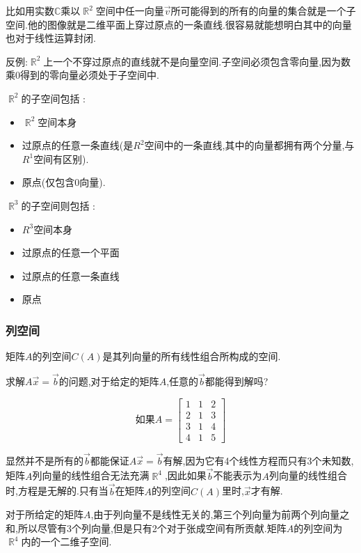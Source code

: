 \documentclass[UTF8,12pt]{ctexbook}
\newcommand{\mathConstant}{\mathbb{C}}
\DeclareMathOperator{\mathRealNumberCollection}{\mathbb{R}}
\begin{document}
{{{{{  比如用实数$\mathConstant$乘以$\mathRealNumberCollection^2$空间中任一向量$\vec{v}$所可能得到的所有的向量的集合就是一个子空间.他的图像就是二维平面上穿过原点的一条直线.很容易就能想明白其中的向量也对于线性运算封闭.

  反例:$\mathRealNumberCollection^2$上一个不穿过原点的直线就不是向量空间.子空间必须包含零向量,因为数乘$0$得到的零向量必须处于子空间中.

  $\mathRealNumberCollection^2$的子空间包括 :
  \begin{itemize}
    \item $\mathRealNumberCollection^2$空间本身
    \item 过原点的任意一条直线(是$R^2$空间中的一条直线,其中的向量都拥有两个分量,与$R^1$空间有区别).
    \item 原点(仅包含$0$向量).
  \end{itemize}

  $\mathRealNumberCollection^3$的子空间则包括 :
  \begin{itemize}
    \item $R^3$空间本身
    \item 过原点的任意一个平面
    \item 过原点的任意一条直线
    \item 原点
  \end{itemize}
}%

\subsubsection{列空间}{
  矩阵$A$的列空间$C(A)$是其列向量的所有线性组合所构成的空间.

  求解$A\vec{x} = \vec{b}$的问题,对于给定的矩阵$A$,任意的$\vec{b}$都能得到解吗?

  $$
    \mbox{如果}A = \begin{bmatrix}
      1 & 1 & 2 \\
      2 & 1 & 3 \\
      3 & 1 & 4 \\
      4 & 1 & 5
    \end{bmatrix}
  $$

  显然并不是所有的$\vec{b}$都能保证$A\vec{x} = \vec{b}$有解,因为它有4个线性方程而只有3个未知数,矩阵$A$列向量的线性组合无法充满$\mathRealNumberCollection^4$,因此如果$\vec{b}$不能表示为$A$列向量的线性组合时,方程是无解的.只有当$\vec{b}$在矩阵$A$的列空间$C(A)$里时,$\vec{x}$才有解.

  对于所给定的矩阵$A$,由于列向量不是线性无关的,第三个列向量为前两个列向量之和,所以尽管有3个列向量,但是只有2个对于张成空间有所贡献.矩阵$A$的列空间为$\mathRealNumberCollection^4$内的一个二维子空间.
}%

}}}}
\end{document}
